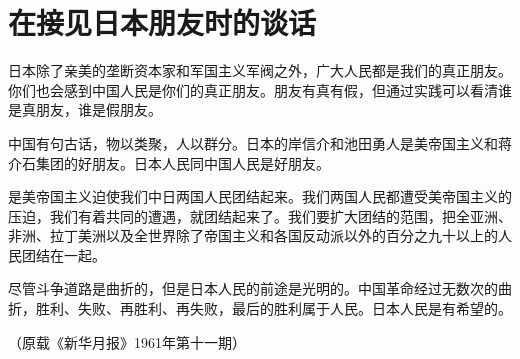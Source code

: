 \section[在接见日本朋友时的谈话（一九六一年十月七日）]{在接见日本朋友时的谈话}

日本除了亲美的垄断资本家和军国主义军阀之外，广大人民都是我们的真正朋友。你们也会感到中国人民是你们的真正朋友。朋友有真有假，但通过实践可以看清谁是真朋友，谁是假朋友。

中国有句古话，物以类聚，人以群分。日本的岸信介和池田勇人是美帝国主义和蒋介石集团的好朋友。日本人民同中国人民是好朋友。

是美帝国主义迫使我们中日两国人民团结起来。我们两国人民都遭受美帝国主义的压迫，我们有着共同的遭遇，就团结起来了。我们要扩大团结的范围，把全亚洲、非洲、拉丁美洲以及全世界除了帝国主义和各国反动派以外的百分之九十以上的人民团结在一起。

尽管斗争道路是曲折的，但是日本人民的前途是光明的。中国革命经过无数次的曲折，胜利、失败、再胜利、再失败，最后的胜利属于人民。日本人民是有希望的。

{\raggedleft （原载《新华月报》1961年第十一期）\par}


